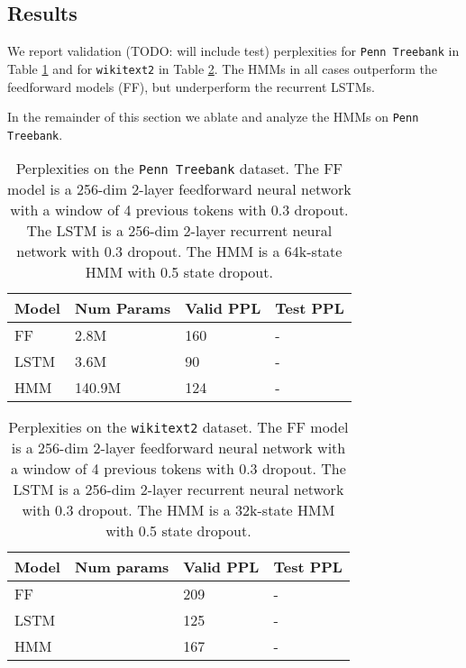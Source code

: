 \documentclass[11pt,a4paper]{article}
\begin{document}
\subsection{Results}
We report validation (TODO: will include test) perplexities 
for \texttt{Penn Treebank} in Table \ref{tbl:ppl-ptb} and for 
\texttt{wikitext2} in Table \ref{tbl:ppl-wikitext2}.
The HMMs in all cases outperform the feedforward models (FF),
but underperform the recurrent LSTMs.



In the remainder of this section we ablate and analyze the HMMs on \texttt{Penn Treebank}.


\begin{table}[!t]
\centering
\caption{\label{tbl:ppl-ptb}
Perplexities on the \texttt{Penn Treebank} dataset.
The FF model is a 256-dim 2-layer feedforward neural network
with a window of 4 previous tokens with 0.3 dropout.
The LSTM is a 256-dim 2-layer recurrent neural network with 0.3 dropout.
The HMM is a 64k-state HMM with 0.5 state dropout.
}
\begin{tabular}{llll}
\toprule
Model & Num Params & Valid PPL & Test PPL\\
\midrule
FF    & 2.8M       & 160         & -       \\
LSTM  & 3.6M       & 90          & -       \\
HMM   & 140.9M     & 124         & -       \\
\bottomrule
\end{tabular}
\end{table}

\begin{table}[!t]
\centering
\caption{\label{tbl:ppl-wikitext2}
Perplexities on the \texttt{wikitext2} dataset.
The FF model is a 256-dim 2-layer feedforward neural network
with a window of 4 previous tokens with 0.3 dropout.
The LSTM is a 256-dim 2-layer recurrent neural network with 0.3 dropout.
The HMM is a 32k-state HMM with 0.5 state dropout.
}
\begin{tabular}{llll}
\toprule
Model & Num params & Valid PPL & Test PPL\\
\midrule
FF    &            & 209       & -       \\
LSTM  &            & 125       & -       \\
HMM   &            & 167       & -       \\
\bottomrule
\end{tabular}
\end{table}
\end{document}
